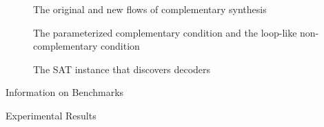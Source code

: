 \documentclass[journal]{IEEEtran}
\begin{document}
\begin{figure}[t]
\begin{center}
\end{center}
\caption{The original and new flows of complementary synthesis}
  \label{flow}
\end{figure}


\begin{figure}[t]
\begin{center}
\end{center}
\caption{The parameterized complementary condition and the loop-like non-complementary condition}
  \label{fig_pcln}
\end{figure}



\begin{figure}[t]
\centering
\caption{The SAT instance that discovers decoders}
\label{fig_fdtest}
\end{figure}


\begin{table}[t]
\centering
\caption{Information on Benchmarks}
\end{table}


\begin{table}[t]
\centering
\caption{Experimental Results}
\end{table}
\end{document}
